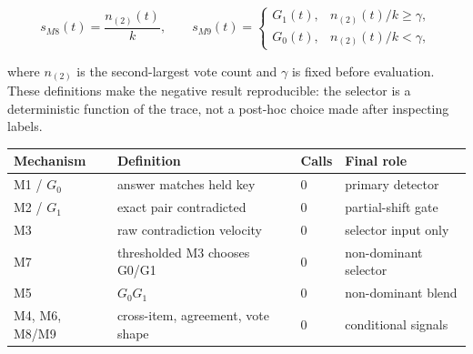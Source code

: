 \documentclass[pdflatex,sn-basic]{sn-jnl}
\makeatletter
\theoremstyle{definition}
\newenvironment{eqbox}%
{\par\vspace{9pt}\noindent\begin{lrbox}{\eqsavebox}\begin{minipage}{\dimexpr\linewidth-18pt}\boldmath}%
{\end{minipage}\end{lrbox}\setlength{\fboxsep}{8pt}\noindent\colorbox{eqgrey}{\usebox{\eqsavebox}}\par\vspace{7pt}}
\def\tablebodyfont{\reset@font\fontsize{10.5bp}{12.5bp}\selectfont}
\renewenvironment{table}[1][]%
{\begin{tableorg}[#1]%
  \begin{center}%
  \begin{threeparttable}%
  \tablebodyfont%
  \setlength{\parskip}{0pt}%
  \renewcommand{\arraystretch}{1.20}%
  \renewcommand\footnotetext[2][]{{\removelastskip\vskip3pt%
    \let\tablebodyfont\tablefootnotefont%
    \hskip0pt\if!##1!\else{\smash{$^{##1}$}}\fi##2\par}}%
}{\end{threeparttable}\end{center}\end{tableorg}}
\makeatother
\begin{document}
\begin{eqbox}
\[
s_{M8}(t)=\frac{n_{(2)}(t)}{k},\qquad
s_{M9}(t)=\begin{cases}
G_1(t),&n_{(2)}(t)/k\geq\gamma,\\
G_0(t),&n_{(2)}(t)/k<\gamma,
\end{cases}
\]
\end{eqbox}

where $n_{(2)}$ is the second-largest vote count and $\gamma$ is fixed before evaluation.
These definitions make the negative result reproducible: the selector is a deterministic
function of the trace, not a post-hoc choice made after inspecting labels.

\begin{table}[!ht]
\centering\footnotesize
\setlength{\tabcolsep}{3pt}
\begin{tabular}{p{25mm}p{40mm}p{15mm}p{42mm}}
\toprule
Mechanism & Definition & Calls & Final role\\
\midrule
M1 / $G_0$ & answer matches held key & 0 & primary detector\\
M2 / $G_1$ & exact pair contradicted & 0 & partial-shift gate\\
M3 & raw contradiction velocity & 0 & selector input only\\
M7 & thresholded M3 chooses G0/G1 & 0 & non-dominant selector\\
M5 & $G_0G_1$ & 0 & non-dominant blend\\
M4, M6, M8/M9 & cross-item, agreement, vote shape & 0 & conditional signals\\
\bottomrule
\end{tabular}
\caption{The mechanism inventory after registered tests.}
\label{tab:mechanisms}
\end{table}
\end{document}
